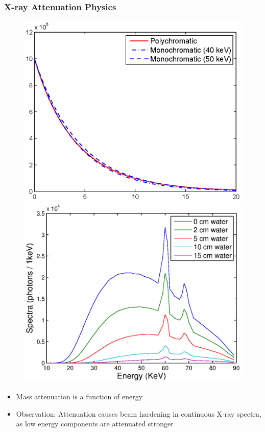 \begin{frame}
    \frametitle{X-ray Attenuation Physics}
    \begin{figure}
        \includegraphics[height=0.6\textheight]{images/phxray1.eps}\includegraphics[height=0.6\textheight]{images/phxray2.eps}\\
    \end{figure}
    \begin{itemize}
        \item Mass attenuation is a function of energy
        \item Observation: Attenuation causes beam hardening in continuous X-ray spectra, as low energy components are attenuated stronger
    \end{itemize}
\end{frame}

